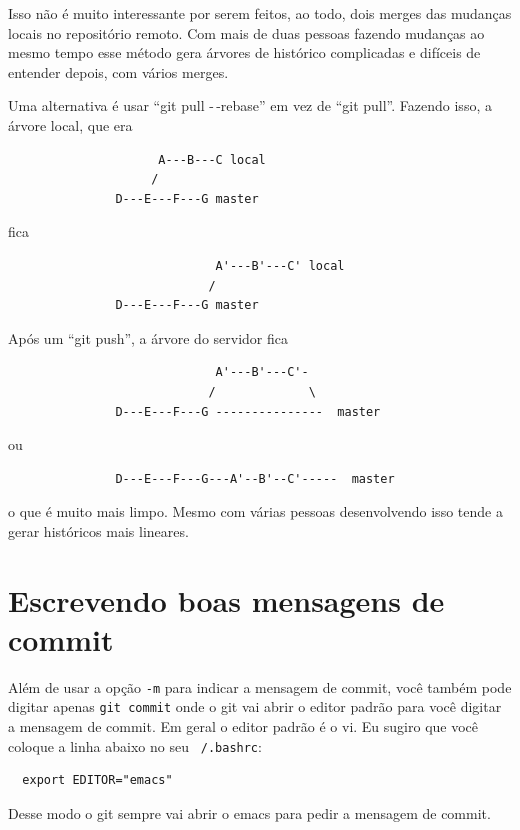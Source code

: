 \documentclass[12pt,brazil]{book}
\begin{document}
Isso não é muito interessante por serem feitos, ao todo, dois merges
das mudanças locais no repositório remoto. Com mais de duas pessoas
fazendo mudanças ao mesmo tempo esse método gera árvores de histórico
complicadas e difíceis de entender depois, com vários merges.

Uma alternativa é usar ``git pull -\,-rebase'' em vez de ``git
pull''. Fazendo isso, a árvore local, que era

\begin{verbatim}
                     A---B---C local
                    /
               D---E---F---G master
\end{verbatim}

fica

\begin{verbatim}
                             A'---B'---C' local
                            /
               D---E---F---G master
\end{verbatim}

Após um ``git push'', a árvore do servidor fica

\begin{verbatim}
                             A'---B'---C'-
                            /             \
               D---E---F---G ---------------  master
\end{verbatim}

ou

\begin{verbatim}
               D---E---F---G---A'--B'--C'-----  master
\end{verbatim}

o que é muito mais limpo. Mesmo com várias pessoas desenvolvendo isso
tende a gerar históricos mais lineares.

\section{Escrevendo boas mensagens de commit}
\label{sec:escr-boas-mens}

Além de usar a opção \texttt{-m} para indicar a mensagem de commit,
você também pode digitar apenas \texttt{git commit} onde o git vai
abrir o editor padrão para você digitar a mensagem de commit. Em geral
o editor padrão é o vi. Eu sugiro que você coloque a linha abaixo no
seu \texttt{~/.bashrc}:

\begin{verbatim}
  export EDITOR="emacs"
\end{verbatim}

Desse modo o git sempre vai abrir o emacs para pedir a mensagem de
commit.
\end{document}
